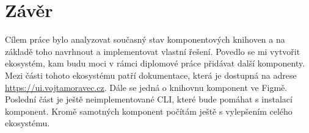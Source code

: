 
\chapter{Závěr}


Cílem práce bylo analyzovat současný stav komponentových knihoven a na základě toho navrhnout a implementovat
vlastní řešení. Povedlo se mi vytvořit ekosystém, kam budu moci v rámci diplomové práce přidávat další komponenty.
Mezi části tohoto ekosystému patří dokumentace, která je dostupná na adrese \url{https://ui.vojtamoravec.cz}. Dále
se jedná o knihovnu komponent ve Figmě. Poslední část je ještě neimplementované CLI, které bude pomáhat s instalací
komponent. Kromě samotných komponent počítám ještě s vylepšením celého ekosystému.
